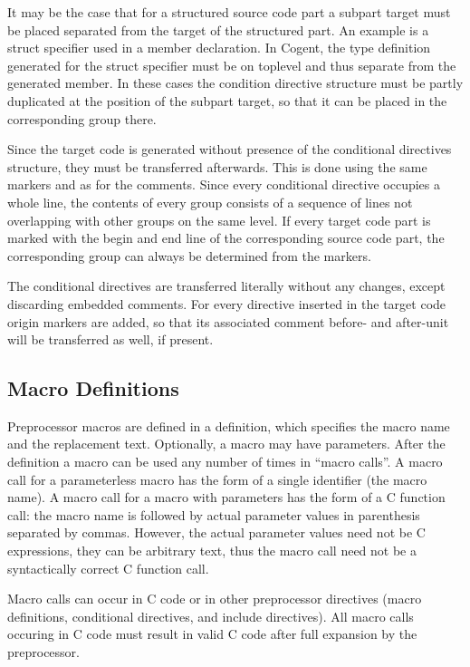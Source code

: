 It may be the case that for a structured source code part a subpart target must be placed separated from the
target of the structured part. An example is a struct specifier used in a member declaration. In Cogent, the 
type definition generated for the struct specifier must be on toplevel and thus separate from the generated member.
In these cases the condition directive structure must be partly duplicated at the position of the subpart target,
so that it can be placed in the corresponding group there.

Since the target code is generated without presence of the conditional directives structure, they must be 
transferred afterwards. This is done using the same markers  and  as for the
comments. Since every conditional directive occupies a whole line, the contents of every group consists of
a sequence of lines not overlapping with other groups on the same level. If every target code part is marked 
with the begin and end line of the corresponding source code part, the corresponding group can always be
determined from the markers.

The conditional directives are transferred literally without any changes, except discarding embedded comments. 
For every directive inserted in the target code origin markers are added, so that its associated comment before-
and after-unit will be transferred as well, if present.

\subsection{Macro Definitions}
\label{design-preprocessor-macros}

Preprocessor macros are defined in a definition, which specifies the macro name and the replacement text. Optionally,
a macro may have parameters. After the definition a macro can be used any number of times in ``macro calls''.
A macro call for a parameterless macro has the form of a single identifier (the macro name). A macro call for
a macro with parameters has the form of a C function call: the macro name is followed by actual parameter values
in parenthesis separated by commas. However, the actual parameter values need not be C expressions, they can be 
arbitrary text, thus the macro call need not be a syntactically correct C function call.

Macro calls can occur in C code or in other preprocessor directives (macro definitions, conditional directives, 
and include directives). All macro calls occuring in C code must result in valid C code after full expansion 
by the preprocessor.

